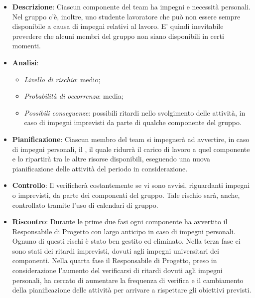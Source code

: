 			\begin{itemize}
				\item \textbf{Descrizione}: Ciascun componente del team ha impegni e necessità personali. Nel gruppo c'è, inoltre, uno studente lavoratore che può non essere sempre disponibile a causa di impegni relativi al lavoro. E' quindi inevitabile prevedere che alcuni membri del gruppo non siano disponibili in certi momenti.
				\item \textbf{Analisi}:
				\begin{itemize}
					\item \textit{Livello di rischio}: medio;
					\item \textit{Probabilità di occorrenza}: media;
					\item \textit{Possibili conseguenze}: possibili ritardi nello svolgimento delle attività, in caso di impegni imprevisti da parte di qualche componente del gruppo.
				\end{itemize}
				\item \textbf{Pianificazione}: Ciascun membro del team si impegnerà ad avvertire, in caso di impegni personali, il , il quale ridurrà il carico di lavoro a quel componente e lo ripartirà tra le altre risorse disponibili, eseguendo una nuova pianificazione delle attività del periodo in considerazione.
				\item \textbf{Controllo}: Il  verificherà costantemente se vi sono avvisi, riguardanti impegni o imprevisti, da parte dei componenti del gruppo. Tale rischio sarà, anche, controllato tramite l'uso di calendari di gruppo.
				\item \textbf{Riscontro}: Durante le prime due fasi ogni componente ha avvertito il Responsabile di Progetto con largo anticipo in caso di impegni personali. Ognuno di questi rischi è stato ben gestito ed eliminato. Nella terza fase ci sono stati dei ritardi imprevisti, dovuti agli impegni universitari dei componenti. Nella quarta fase il Responsabile di Progetto, preso in considerazione l’aumento del verificarsi di ritardi dovuti agli impegni personali, ha cercato di aumentare la frequenza di verifica e il cambiamento della pianificazione delle attività per arrivare a rispettare gli obiettivi previsti.
			\end{itemize}
